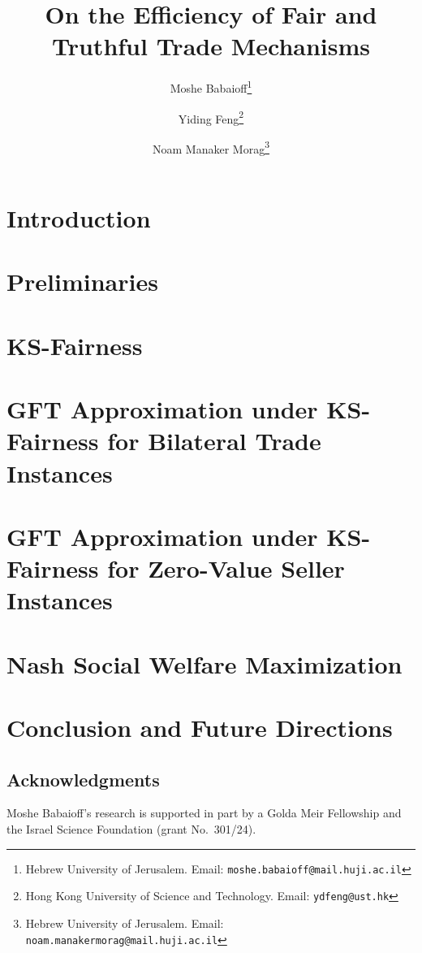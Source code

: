 \documentclass[11pt]{article}
\title{On the Efficiency of Fair and Truthful Trade Mechanisms}
\author{
Moshe Babaioff\thanks{Hebrew University of Jerusalem. Email: {\tt moshe.babaioff@mail.huji.ac.il}} \and Yiding Feng\thanks{Hong Kong University of Science and Technology. Email: {\tt ydfeng@ust.hk}} \and Noam Manaker Morag\thanks{Hebrew University of Jerusalem. Email: {\tt noam.manakermorag@mail.huji.ac.il}}
}
\date{}
\begin{document}
\maketitle
\begin{abstract}
    
\end{abstract}

\thispagestyle{empty}
\newpage



\section{Introduction}



\section{Preliminaries}



\section{KS-Fairness}
\label{sec:ksfairness}


\section{GFT Approximation under KS-Fairness for Bilateral Trade Instances}
\label{sec:general-gft-approx}


\section{GFT Approximation under KS-Fairness for Zero-Value Seller Instances}



\section{Nash Social Welfare Maximization}
\label{sec:nash fairness}


\section{Conclusion and Future Directions}
\label{sec:conclusion}


\subsection*{Acknowledgments} 
Moshe Babaioff's research is supported in part by a Golda Meir Fellowship and the Israel Science Foundation (grant No.\ 301/24).
\end{document}
